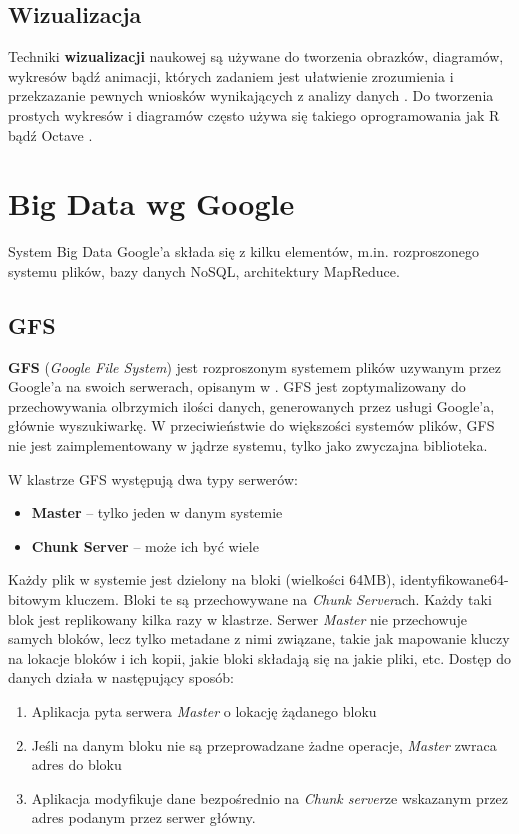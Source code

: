 \documentclass[twocolumn]{svjour3}          %
\begin{document}
\subsection{Wizualizacja}
\label{sub:wizualizacja}
Techniki \textbf{wizualizacji} naukowej są używane do tworzenia obrazków, diagramów, wykresów bądź animacji, których zadaniem jest ułatwienie zrozumienia i przekzazanie pewnych wniosków wynikających z analizy danych \cite{lawrence1994}. Do tworzenia prostych wykresów i diagramów często używa się takiego oprogramowania jak R \cite{www:R} bądź Octave \cite{www:octave}.

\section{Big Data wg Google}
\label{ssub:google}
System Big Data Google'a składa się z kilku elementów, m.in. rozproszonego systemu plików, bazy danych NoSQL, architektury MapReduce.

\subsection{GFS}
\label{ssub:gfs}
\textbf{GFS} (\textit{Google File System}) jest rozproszonym systemem plików uzywanym przez Google'a na swoich serwerach, opisanym w \cite{ghemawat03}. GFS jest zoptymalizowany do przechowywania olbrzymich ilości danych, generowanych przez usługi Google'a, głównie wyszukiwarkę. W przeciwieństwie do większości systemów plików, GFS nie jest zaimplementowany w jądrze systemu, tylko jako zwyczajna biblioteka.

W klastrze GFS występują dwa typy serwerów:
\begin{itemize}
    \item \textbf{Master} -- tylko jeden w danym systemie
    \item \textbf{Chunk Server} -- może ich być wiele
\end{itemize}
Każdy plik w systemie jest dzielony na bloki (wielkości 64MB), identyfikowane64-bitowym kluczem. Bloki te są przechowywane na \textit{Chunk Server}ach. Każdy taki blok jest replikowany kilka razy w klastrze.
Serwer \textit{Master} nie przechowuje samych bloków, lecz tylko metadane z nimi związane, takie jak mapowanie kluczy na lokacje bloków i ich kopii, jakie bloki składają się na jakie pliki, etc.
Dostęp do danych działa w następujący sposób:
\begin{enumerate}
    \item Aplikacja pyta serwera \textit{Master} o lokację żądanego bloku
    \item Jeśli na danym bloku nie są przeprowadzane żadne operacje, \textit{Master} zwraca adres do bloku
    \item Aplikacja modyfikuje dane bezpośrednio na \textit{Chunk server}ze wskazanym przez adres podanym przez serwer główny.
\end{enumerate}
\end{document}
